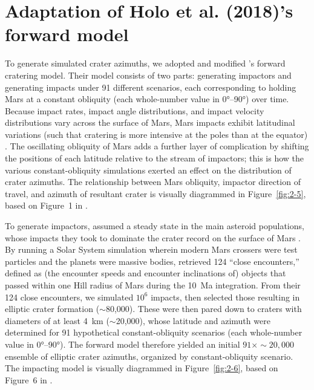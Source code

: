 \documentclass{ucetd}
\begin{document}
\section{Adaptation of Holo et al. (2018)’s forward model}
\label{section:2-3}

To generate simulated crater azimuths, we adopted and modified \citet{holo2018a}’s forward cratering model. Their model consists of two parts: generating impactors and generating impacts under 91 different scenarios, each corresponding to holding Mars at a constant obliquity (each whole-number value in 0°--90°) over time. Because impact rates, impact angle distributions, and impact velocity distributions vary across the surface of Mars, Mars impacts exhibit latitudinal variations (such that cratering is more intensive at the poles than at the equator) \citep{lefeuvre2008a}. The oscillating obliquity of Mars adds a further layer of complication by shifting the positions of each latitude relative to the stream of impactors; this is how the various constant-obliquity simulations exerted an effect on the distribution of crater azimuths. The relationship between Mars obliquity, impactor direction of travel, and azimuth of resultant crater is visually diagrammed in Figure~\ref{fig:2-5}, based on Figure~1 in \citet{holo2018a}.

To generate impactors, \citet{holo2018a} assumed a steady state in the main asteroid populations, whose impacts they took to dominate the crater record on the surface of Mars \citep{bottke2000a, bottke2002a}. By running a Solar System simulation wherein modern Mars crossers were test particles and the planets were massive bodies, \citeauthor{holo2018a} retrieved 124 “close encounters,” defined as (the encounter speeds and encounter inclinations of) objects that passed within one Hill radius of Mars during the 10~Ma integration. From their 124 close encounters, we simulated $10^6$ impacts, then selected those resulting in elliptic crater formation ($\sim$80,000). These were then pared down to craters with diameters of at least 4~km ($\sim$20,000), whose latitude and azimuth were determined for 91 hypothetical constant-obliquity scenarios (each whole-number value in 0°--90°). The forward model therefore yielded an initial $91\times\sim20,000$ ensemble of elliptic crater azimuths, organized by constant-obliquity scenario. The impacting model is visually diagrammed in Figure~\ref{fig:2-6}, based on Figure~6 in \citep{holo2018a}.
\end{document}
